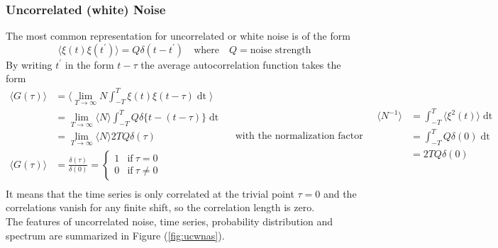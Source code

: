 \subsubsection{Uncorrelated (white) Noise}
The most common representation for uncorrelated or white noise is of the form
\begin{equation}
	\langle \xi(t)\xi(t^\prime)\rangle=Q\delta(t-t^\prime)\quad\text{where}\quad Q=\text{noise strength}
\end{equation}
By writing $t^\prime$ in the form $t-\tau$ the average autocorrelation function takes the form
\begin{equation}
	\begin{aligned}
		\langle G(\tau)\rangle&=\langle \lim_{T\rightarrow\infty}N\int_{-T}^T \xi(t)\xi(t-\tau)\mathop{dt}\rangle\\
		&=\lim_{T\rightarrow\infty}\langle N\rangle\int_{-T}^T Q\delta\{t-(t-\tau)\}\mathop{dt}\\
		&=\lim_{T\rightarrow\infty}\langle N\rangle2TQ\delta(\tau)\\
		\langle G(\tau)\rangle&=\frac{\delta(\tau)}{\delta(0)}=
		\begin{cases}
			1&\text{if}\ \tau=0\\
			0&\text{if}\ \tau\neq0
		\end{cases}\\
	\end{aligned}\quad\text{with the normalization factor}\quad
	\begin{aligned}
		\langle N^{-1}\rangle&=\int_{-T}^T \langle \xi^2(t)\rangle\mathop{dt}\\
		&=\int_{-T}^T Q\delta(0)\mathop{dt}\\
		&=2TQ\delta(0)\\
	\end{aligned}
\end{equation}
It means that the time series is only correlated at the trivial point $\tau=0$ and the correlations vanish for any finite shift, so the correlation length is zero.\\
The features of uncorrelated noise, time series, probability distribution and spectrum are summarized in Figure (\ref{fig:ucwnas}).
